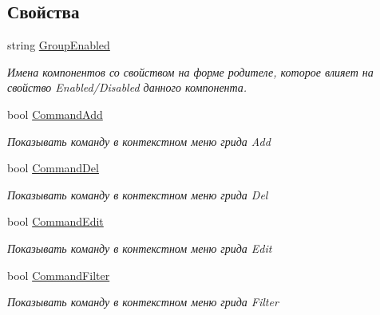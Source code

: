 \subsection*{Свойства}
\begin{DoxyCompactItemize}
\item 
string \mbox{\hyperlink{class_f_b_a_1_1_data_grid_view_f_b_a_afe89165f195cdc5ea96fcafc4be807d8}{Group\+Enabled}}
\begin{DoxyCompactList}\small\item\em Имена компонентов со свойством на форме родителе, которое влияет на свойство Enabled/\+Disabled данного компонента. \end{DoxyCompactList}\item 
bool \mbox{\hyperlink{class_f_b_a_1_1_data_grid_view_f_b_a_a1428b725a17156be63ee843e43ed66d1}{Command\+Add}}
\begin{DoxyCompactList}\small\item\em Показывать команду в контекстном меню грида Add \end{DoxyCompactList}\item 
bool \mbox{\hyperlink{class_f_b_a_1_1_data_grid_view_f_b_a_aa2b7e0376e10b29a29abfe805d0fe022}{Command\+Del}}
\begin{DoxyCompactList}\small\item\em Показывать команду в контекстном меню грида Del \end{DoxyCompactList}\item 
bool \mbox{\hyperlink{class_f_b_a_1_1_data_grid_view_f_b_a_a90398ab9db87c2fb7724c15b32c8c2ac}{Command\+Edit}}
\begin{DoxyCompactList}\small\item\em Показывать команду в контекстном меню грида Edit \end{DoxyCompactList}\item 
bool \mbox{\hyperlink{class_f_b_a_1_1_data_grid_view_f_b_a_a2727cf2e23422cd216268b8f2ffea8af}{Command\+Filter}}
\begin{DoxyCompactList}\small\item\em Показывать команду в контекстном меню грида Filter \end{DoxyCompactList}\item 

\end{DoxyCompactItemize}
